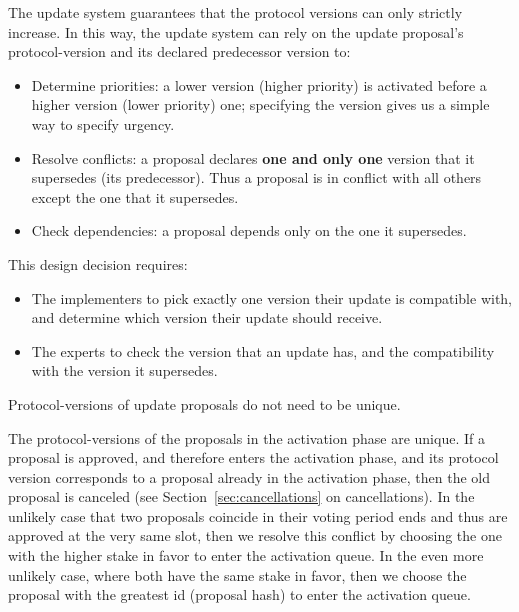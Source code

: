The update system guarantees that the protocol versions can only strictly
increase. In this way, the update system can rely on the update proposal's
protocol-version and its declared predecessor version to:
\begin{itemize}
	\item Determine priorities: a lower version (higher priority) is activated
	before a higher version (lower priority) one; specifying the version gives
	us a
	simple way to specify urgency.
	\item Resolve conflicts: a proposal declares \textbf{one and only one}
	version
	that it supersedes (its predecessor). Thus a proposal is in conflict with
	all
	others except the one that it supersedes.
	\item Check dependencies: a proposal depends only on the one it supersedes.
\end{itemize}
This design decision requires:
\begin{itemize}
	\item The implementers to pick exactly one version their update is
	compatible
	with, and determine which version their update should receive.
	\item The experts to check the version that an update has, and the
	compatibility
	with the version it supersedes.
\end{itemize}

Protocol-versions of update proposals do not need to be unique.


The protocol-versions of the proposals in the activation phase are unique. If a
proposal is approved, and therefore enters the activation phase, and its
protocol version corresponds to a proposal already in the activation phase, then
the old proposal is canceled (see Section~\ref{sec:cancellations} on
cancellations). In the unlikely case that two proposals coincide in their
voting period ends and thus are approved at the very same slot, then we resolve
this conflict by choosing the one with the higher stake in favor to enter the
activation queue. In the even more unlikely case, where both have the same stake
in favor, then we choose the proposal with the greatest id (proposal hash) to
enter the activation queue.

